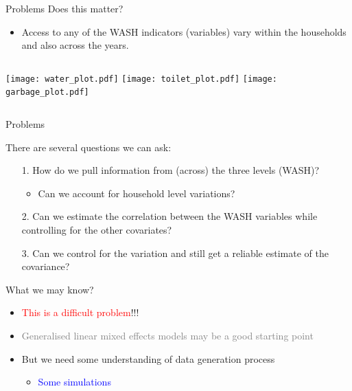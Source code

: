 \documentclass{beamer}
\begin{document}
\begin{frame}{Problems}
Does this matter?

\begin{itemize}[<+->]
\item Access to any of the WASH indicators (variables) vary within the households and also across the years.
\end{itemize}
\pause
\begin{columns}[t]
\texttt{[image: water\_plot.pdf]}
\pause
{}
\texttt{[image: toilet\_plot.pdf]}
\pause
{}
\texttt{[image: garbage\_plot.pdf]}
\end{columns}
\end{frame}

\begin{frame}{Problems}

There are several questions we can ask:
\begin{itemize}[<+->]
\item[1.] How do we pull information from (across) the three levels (WASH)?
\begin{itemize}[<+->]
\item Can we account for household level variations?
\end{itemize}
\item[2.] Can we estimate the correlation between the WASH variables while controlling for the other covariates?
\item[3.] Can we control for the variation and still get a reliable estimate of the covariance?
\end{itemize}

\pause
What we may know?
\begin{itemize}[<+->]
\item \textcolor{red}{This is a difficult problem}!!!
\item \textcolor{gray}{Generalised linear mixed effects models may be a good starting point}
\item But we need some understanding of data generation process
\begin{itemize}[<+->]
\item \textcolor{blue}{Some simulations}
\end{itemize}
\end{itemize}

\end{frame}
\end{document}
